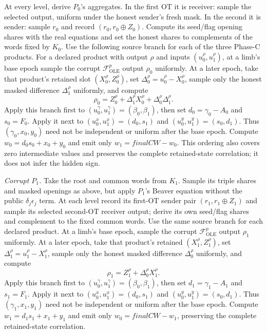 \documentclass[11pt]{article}
\begin{document}
At every level, derive $P_0$'s aggregates. In the first OT it is receiver:
sample the selected output, uniform under the honest sender's fresh mask. In
the second it is sender: sample $r_0$ and record
$(r_0,r_0\oplus Z_0)$. Compute its seed/flag opening shares with the real
equations and set the honest shares to complements of the words fixed by
$K_0$. Use the following source branch for each of the three Phase-C products.
For a declared product with output $\rho$ and inputs $(u_0^\rho,u_1^\rho)$,
at a limb's base epoch sample the corrupt
$\mathcal F_{\mathrm{OLE}}^p$ output $\rho_0$ uniformly. At a later epoch,
take that product's retained slot $(X_0^\rho,Z_0^\rho)$, set
$\Delta_0^\rho=u_0^\rho-X_0^\rho$, sample only the honest masked difference
$\Delta_1^\rho$ uniformly, and compute
\[
\rho_0=Z_0^\rho+\Delta_1^\rho X_0^\rho+
\Delta_0^\rho\Delta_1^\rho .
\]
Apply this branch first to
$(u_0^\gamma,u_1^\gamma)=(\beta_0,\beta_1)$, then set
$d_0=\gamma_0-A_0$ and $s_0=F_0$. Apply it next to
$(u_0^x,u_1^x)=(d_0,s_1)$ and
$(u_0^y,u_1^y)=(s_0,d_1)$. Thus $(\gamma_0,x_0,y_0)$ need not be independent
or uniform after the base epoch. Compute $w_0=d_0s_0+x_0+y_0$ and emit only
$w_1=\mathit{finalCW}-w_0$. This ordering also covers zero intermediate
values and preserves the complete retained-state correlation; it does not
infer the hidden sign.

\emph{Corrupt $P_1$.}
Take the root and common words from $K_1$. Sample its triple shares and
masked openings as above, but apply $P_1$'s Beaver equation without the
public $\delta_j\epsilon_j$ term. At each level record its first-OT sender
pair $(r_1,r_1\oplus Z_1)$ and sample its selected second-OT receiver output;
derive its own seed/flag shares and complement to the fixed common words.
Use the same source branch for each declared product. At a limb's base epoch,
sample the corrupt $\mathcal F_{\mathrm{OLE}}^p$ output $\rho_1$ uniformly.
At a later epoch, take that product's retained $(X_1^\rho,Z_1^\rho)$, set
$\Delta_1^\rho=u_1^\rho-X_1^\rho$, sample only the honest masked difference
$\Delta_0^\rho$ uniformly, and compute
\[
\rho_1=Z_1^\rho+\Delta_0^\rho X_1^\rho .
\]
Apply this branch first to
$(u_0^\gamma,u_1^\gamma)=(\beta_0,\beta_1)$, then set
$d_1=\gamma_1-A_1$ and $s_1=F_1$. Apply it next to
$(u_0^x,u_1^x)=(d_0,s_1)$ and
$(u_0^y,u_1^y)=(s_0,d_1)$. Thus $(\gamma_1,x_1,y_1)$ need not be independent
or uniform after the base epoch. Compute $w_1=d_1s_1+x_1+y_1$ and emit only
$w_0=\mathit{finalCW}-w_1$, preserving the complete retained-state
correlation.
\end{document}
